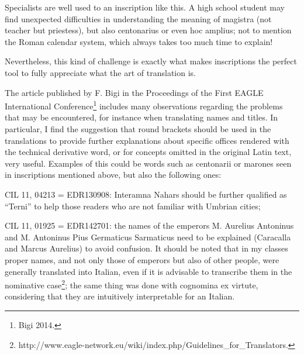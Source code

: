 \documentclass[amsthm,ebook]{saparticle}
\begin{document}
Specialists are well used to an inscription like this. A high school student may find unexpected difficulties in
understanding the meaning of magistra (not teacher but priestess), but also centonarius or even hoc amplius; not to
mention the Roman calendar system, which always takes too much time to explain!

Nevertheless, this kind of challenge is exactly what makes inscriptions the perfect tool to fully appreciate what the
art of translation is.

The article published by F. Bigi in the Proceedings of the First EAGLE International Conference\footnote{ Bigi 2014.}
includes many observations regarding the problems that may be encountered, for instance when translating names and
titles. In particular, I find the suggestion that round brackets should be used in the translations to provide further
explanations about specific offices rendered with the technical derivative word, or for concepts omitted in the
original Latin text, very useful. Examples of this could be words such as centonarii or marones seen in inscriptions
mentioned above, but also the following ones:

\textwide{\FilledBigTriangleRight} CIL 11, 04213 = EDR130908: Interamna Nahars should be further qualified as “Terni” to
help those readers who are not familiar with Umbrian cities;

\textwide{\FilledBigTriangleRight} CIL 11, 01925 = EDR142701: the names of the emperors M. Aurelius Antoninus and M.
Antoninus Pius Germaticus Sarmaticus need to be explained (Caracalla and Marcus Aurelius) to avoid confusion. It should
be noted that in my classes proper names, and not only those of emperors but also of other people, were generally
translated into Italian, even if it is advisable to transcribe them in the nominative case\footnote{
http://www.eagle-network.eu/wiki/index.php/Guidelines\_for\_Translators.}; the same thing was done with cognomina ex
virtute, considering that they are intuitively interpretable for an Italian.


\bigskip
\end{document}

